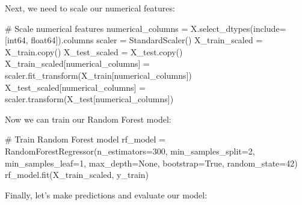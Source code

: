 \documentclass[
  letterpaper,
  DIV=11,
  numbers=noendperiod]{scrartcl}
\newenvironment{Shaded}{\begin{snugshade}}{\end{snugshade}}
\newcommand{\CommentTok}[1]{\textcolor[rgb]{0.37,0.37,0.37}{#1}}
\newcommand{\DecValTok}[1]{\textcolor[rgb]{0.68,0.00,0.00}{#1}}
\newcommand{\NormalTok}[1]{\textcolor[rgb]{0.00,0.23,0.31}{#1}}
\newcommand{\OperatorTok}[1]{\textcolor[rgb]{0.37,0.37,0.37}{#1}}
\newcommand{\StringTok}[1]{\textcolor[rgb]{0.13,0.47,0.30}{#1}}
\newcommand{\VariableTok}[1]{\textcolor[rgb]{0.07,0.07,0.07}{#1}}
\begin{document}
Next, we need to scale our numerical features:

\begin{Shaded}
\begin{Highlighting}[]
\CommentTok{\# Scale numerical features}
\NormalTok{numerical\_columns }\OperatorTok{=}\NormalTok{ X.select\_dtypes(include}\OperatorTok{=}\NormalTok{[}\StringTok{\textquotesingle{}int64\textquotesingle{}}\NormalTok{, }\StringTok{\textquotesingle{}float64\textquotesingle{}}\NormalTok{]).columns}
\NormalTok{scaler }\OperatorTok{=}\NormalTok{ StandardScaler()}
\NormalTok{X\_train\_scaled }\OperatorTok{=}\NormalTok{ X\_train.copy()}
\NormalTok{X\_test\_scaled }\OperatorTok{=}\NormalTok{ X\_test.copy()}
\NormalTok{X\_train\_scaled[numerical\_columns] }\OperatorTok{=}\NormalTok{ scaler.fit\_transform(X\_train[numerical\_columns])}
\NormalTok{X\_test\_scaled[numerical\_columns] }\OperatorTok{=}\NormalTok{ scaler.transform(X\_test[numerical\_columns])}
\end{Highlighting}
\end{Shaded}

Now we can train our Random Forest model:

\begin{Shaded}
\begin{Highlighting}[]
\CommentTok{\# Train Random Forest model}
\NormalTok{rf\_model }\OperatorTok{=}\NormalTok{ RandomForestRegressor(n\_estimators}\OperatorTok{=}\DecValTok{300}\NormalTok{, min\_samples\_split}\OperatorTok{=}\DecValTok{2}\NormalTok{, }
\NormalTok{                                 min\_samples\_leaf}\OperatorTok{=}\DecValTok{1}\NormalTok{, max\_depth}\OperatorTok{=}\VariableTok{None}\NormalTok{, }
\NormalTok{                                 bootstrap}\OperatorTok{=}\VariableTok{True}\NormalTok{, random\_state}\OperatorTok{=}\DecValTok{42}\NormalTok{)}
\NormalTok{rf\_model.fit(X\_train\_scaled, y\_train)}
\end{Highlighting}
\end{Shaded}

Finally, let's make predictions and evaluate our model:
\end{document}
